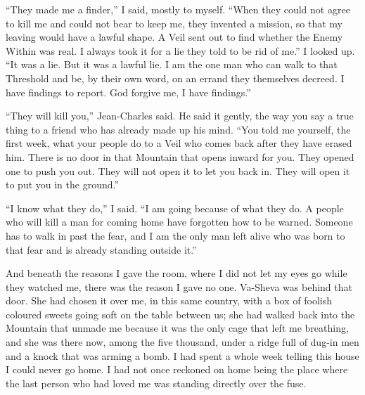 ``They made me a finder,'' I said, mostly to myself. ``When they could not agree to kill me and could not bear to keep me, they invented a mission, so that my leaving would have a lawful shape. A Veil sent out to find whether the Enemy Within was real. I always took it for a lie they told to be rid of me.'' I looked up. ``It was a lie. But it was a lawful lie. I am the one man who can walk to that Threshold and be, by their own word, on an errand they themselves decreed. I have findings to report. God forgive me, I have findings.''\par

``They will kill you,'' Jean-Charles said. He said it gently, the way you say a true thing to a friend who has already made up his mind. ``You told me yourself, the first week, what your people do to a Veil who comes back after they have erased him. There is no door in that Mountain that opens inward for you. They opened one to push you out. They will not open it to let you back in. They will open it to put you in the ground.''\par

``I know what they do,'' I said. ``I am going because of what they do. A people who will kill a man for coming home have forgotten how to be warned. Someone has to walk in past the fear, and I am the only man left alive who was born to that fear and is already standing outside it.''\par

And beneath the reasons I gave the room, where I did not let my eyes go while they watched me, there was the reason I gave no one. Va-Sheva was behind that door. She had chosen it over me, in this same country, with a box of foolish coloured sweets going soft on the table between us; she had walked back into the Mountain that unmade me because it was the only cage that left me breathing, and she was there now, among the five thousand, under a ridge full of dug-in men and a knock that was arming a bomb. I had spent a whole week telling this house I could never go home. I had not once reckoned on home being the place where the last person who had loved me was standing directly over the fuse.\par

